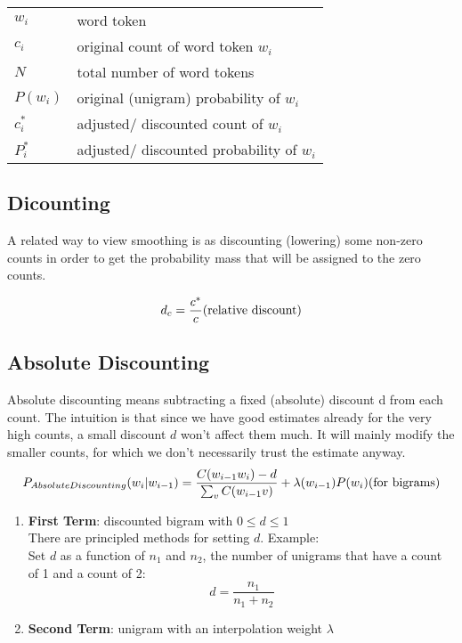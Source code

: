 \begin{customTableWrapper}{1.3}
\begin{table}[H]
    \begin{tabular}{l l}
        $w_i$ & word token \\
        $c_i$ & original count of word token $w_i$ \\
        $N$ & total number of word tokens \\
        $P(w_i)$ & original (unigram) probability of $w_i$ \\
        $c_i^*$ & adjusted/ discounted count of $w_i$ \\
        $P_i^*$ & adjusted/ discounted probability of $w_i$ \\
    \end{tabular}
\end{table}
\end{customTableWrapper}


\subsection{Dicounting \cite{nlp-1}}
A related way to view smoothing is as discounting (lowering) some non-zero counts in order to get the probability mass that will be assigned to the zero counts.


\[
    d_c = \dfrac{c^*}{c}  \hfill \text{(relative discount)}
\]

\subsection{Absolute Discounting}
Absolute discounting means subtracting a fixed (absolute) discount d from each count. The intuition is that since we have good estimates already for the very high counts, a small discount $d$ won’t affect them much. It will mainly modify the smaller counts, for which we don’t necessarily trust the estimate anyway. 
\[
    P_{AbsoluteDiscounting}(w_i|w_{i-1}) = \dfrac{C(w_{i-1}w_i)-d}{\sum_v C(w_{i-1} v)} + \lambda (w_{i-1})P(w_i) \hfill \text{(for bigrams)}
\]

\begin{enumerate}
    \item \textbf{First Term}: discounted bigram with $0 \leq d \leq 1$\\
    There are principled methods for setting $d$. Example:\\
    Set $d$ as a function of $n_1$ and $n_2$, the number of unigrams that have a count of 1 and a count of 2:\\
    \[
        d = \dfrac{n_1}{n_1 + n_2}
    \]
    \item \textbf{Second Term}: unigram with an interpolation weight $\lambda$
\end{enumerate}

